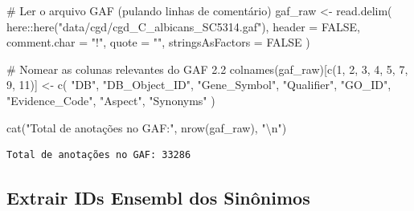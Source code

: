 \documentclass[
  letterpaper,
  DIV=11,
  numbers=noendperiod]{scrreprt}
\newenvironment{Shaded}{\begin{snugshade}}{\end{snugshade}}
\newcommand{\AttributeTok}[1]{\textcolor[rgb]{0.40,0.45,0.13}{#1}}
\newcommand{\CommentTok}[1]{\textcolor[rgb]{0.37,0.37,0.37}{#1}}
\newcommand{\ConstantTok}[1]{\textcolor[rgb]{0.56,0.35,0.01}{#1}}
\newcommand{\DecValTok}[1]{\textcolor[rgb]{0.68,0.00,0.00}{#1}}
\newcommand{\FunctionTok}[1]{\textcolor[rgb]{0.28,0.35,0.67}{#1}}
\newcommand{\NormalTok}[1]{\textcolor[rgb]{0.00,0.23,0.31}{#1}}
\newcommand{\OtherTok}[1]{\textcolor[rgb]{0.00,0.23,0.31}{#1}}
\newcommand{\SpecialCharTok}[1]{\textcolor[rgb]{0.37,0.37,0.37}{#1}}
\newcommand{\StringTok}[1]{\textcolor[rgb]{0.13,0.47,0.30}{#1}}
\begin{document}
\begin{Shaded}
\begin{Highlighting}[]
\CommentTok{\# Ler o arquivo GAF (pulando linhas de comentário)}
\NormalTok{gaf\_raw }\OtherTok{\textless{}{-}} \FunctionTok{read.delim}\NormalTok{(}
\NormalTok{  here}\SpecialCharTok{::}\FunctionTok{here}\NormalTok{(}\StringTok{"data/cgd/cgd\_C\_albicans\_SC5314.gaf"}\NormalTok{),}
  \AttributeTok{header =} \ConstantTok{FALSE}\NormalTok{,}
  \AttributeTok{comment.char =} \StringTok{"!"}\NormalTok{,}
  \AttributeTok{quote =} \StringTok{""}\NormalTok{,}
  \AttributeTok{stringsAsFactors =} \ConstantTok{FALSE}
\NormalTok{)}

\CommentTok{\# Nomear as colunas relevantes do GAF 2.2}
\FunctionTok{colnames}\NormalTok{(gaf\_raw)[}\FunctionTok{c}\NormalTok{(}\DecValTok{1}\NormalTok{, }\DecValTok{2}\NormalTok{, }\DecValTok{3}\NormalTok{, }\DecValTok{4}\NormalTok{, }\DecValTok{5}\NormalTok{, }\DecValTok{7}\NormalTok{, }\DecValTok{9}\NormalTok{, }\DecValTok{11}\NormalTok{)] }\OtherTok{\textless{}{-}} \FunctionTok{c}\NormalTok{(}
  \StringTok{"DB"}\NormalTok{, }\StringTok{"DB\_Object\_ID"}\NormalTok{, }\StringTok{"Gene\_Symbol"}\NormalTok{, }\StringTok{"Qualifier"}\NormalTok{, }\StringTok{"GO\_ID"}\NormalTok{,}
  \StringTok{"Evidence\_Code"}\NormalTok{, }\StringTok{"Aspect"}\NormalTok{, }\StringTok{"Synonyms"}
\NormalTok{)}

\FunctionTok{cat}\NormalTok{(}\StringTok{"Total de anotações no GAF:"}\NormalTok{, }\FunctionTok{nrow}\NormalTok{(gaf\_raw), }\StringTok{"}\SpecialCharTok{\textbackslash{}n}\StringTok{"}\NormalTok{)}
\end{Highlighting}
\end{Shaded}

\begin{verbatim}
Total de anotações no GAF: 33286 
\end{verbatim}

\subsection{Extrair IDs Ensembl dos
Sinônimos}\label{extrair-ids-ensembl-dos-sinuxf4nimos}
\end{document}
